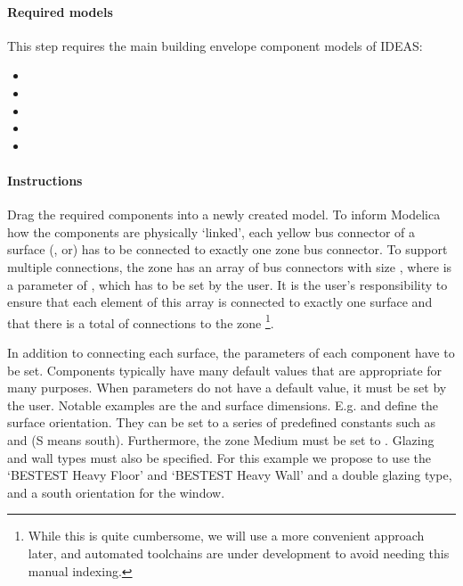 \documentclass[10pt,a4paper]{article}
\begin{document}
\paragraph{Required models}
This step requires the main building envelope component models of IDEAS:
\begin{itemize}
\item {}
\item {}
\item {}
\item {}
\item {}
\end{itemize}

\paragraph{Instructions}
Drag the required components into a newly created model. To inform Modelica how the components are physically `linked', each yellow bus connector of a surface (,  or) has to be connected to exactly one zone bus connector.
To support multiple connections, the zone has an array of bus connectors with size , where  is a parameter of , which has to be set by the user. It is the user's responsibility to ensure that each element of this array is connected to exactly one surface and that there is a total of  connections to the zone \footnote{While this is quite cumbersome, we will use a more convenient approach later, and automated toolchains are under development to avoid needing this manual indexing.}.

In addition to connecting each surface, the parameters of each component have to be set. 
Components typically have many default values that are appropriate for many purposes.
When parameters do not have a default value, it must be set by the user. 
Notable examples are the  and surface dimensions. 
E.g.  and  define the surface orientation.
They can be set to a series of predefined constants such as 
and  (S means south).
Furthermore, the zone Medium must be set to .
Glazing and wall types must also be specified.
For this example we propose to use the `BESTEST Heavy Floor' and `BESTEST Heavy Wall'
and a double glazing type, and a south orientation for the window. 
\end{document}
